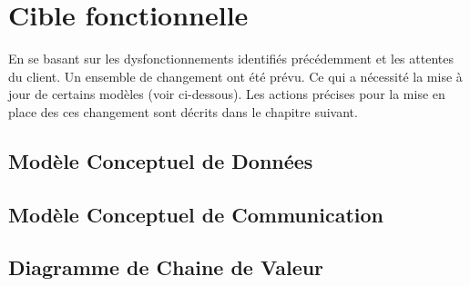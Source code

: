 \section{Cible fonctionnelle}

    En se basant sur les dysfonctionnements identifiés précédemment et les attentes du client. Un ensemble de changement ont été prévu. Ce qui a nécessité la mise à jour de certains modèles (voir ci-dessous). Les actions précises pour la mise en place des ces changement sont décrits dans le chapitre suivant.

    \subsection{Modèle Conceptuel de Données}


    \subsection{Modèle Conceptuel de Communication}


    \subsection{Diagramme de Chaine de Valeur}

